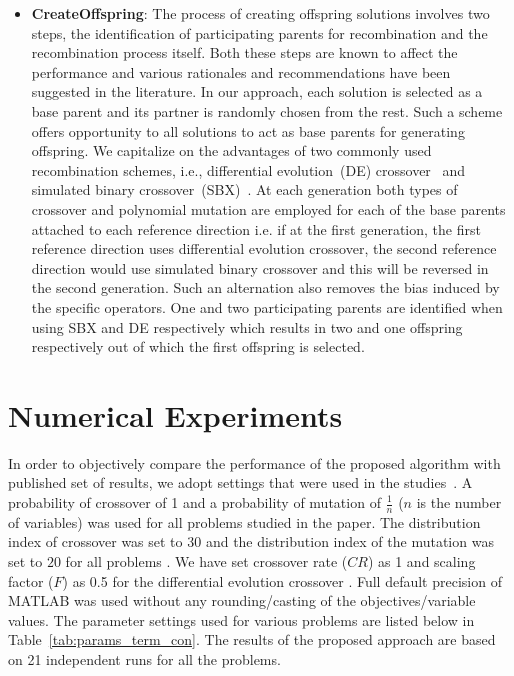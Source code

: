 \documentclass{sig-alternate}
\begin{document}
\begin{itemize}
	\item \textbf{CreateOffspring}: The process of creating offspring solutions involves two steps, the identification of participating parents for recombination and the recombination process itself. Both these steps are known to affect the performance and various rationales and recommendations have been suggested in the literature. In our approach, each solution is selected as a base parent and its partner is randomly chosen from the rest. Such a scheme offers opportunity to all solutions to act as base parents for generating offspring. We capitalize on the advantages of two commonly used recombination schemes, i.e., differential evolution~(DE) crossover~\cite{das2011de} and simulated binary crossover~(SBX)~\cite{deb2002fast}. At each generation both types of crossover and polynomial mutation are employed for each of the base parents attached to each reference direction i.e. if at the first generation, the first reference direction uses differential evolution crossover, the second reference direction would use simulated binary crossover and this will be reversed in the second generation. Such an alternation also removes the bias induced by the specific operators. One and two participating parents are identified when using SBX and DE respectively which results in two and one offspring respectively out of which the first offspring is selected.       
	
\end{itemize}

\section{Numerical Experiments}
\label{sec:expset}

In order to objectively compare the performance of the proposed algorithm with published set of results, we adopt settings that were used in the studies~\cite{Deb2014adaptive,ishibuchi2016inverse}. A probability of crossover of 1 and a probability of mutation of $\frac{1}{n}$ ($n$ is the number of variables) \cite{Deb2014adaptive} was used for all problems studied in the paper. The distribution index of crossover was set to $30$ and the distribution index of the mutation was set to $20$ for all problems \cite{Deb2014adaptive}. We have set crossover rate ($CR$) as 1 and scaling factor ($F$) as 0.5 for the differential evolution crossover \cite{das2011de}. Full default precision of MATLAB was used without any rounding/casting of the objectives/variable values. The parameter settings used for various problems are listed below in Table~\ref{tab:params_term_con}. The results of the proposed approach are based on 21 independent runs for all the problems.  
\end{document}
